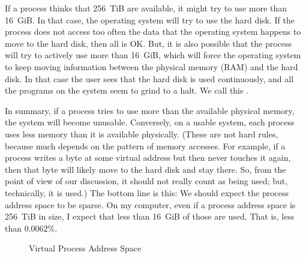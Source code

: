 If a process thinks that 256~TiB are available,
  it might try to use more than 16~GiB\null.
In that case, the operating system will try to use the hard disk.
If the process does not access too often the data that the operating system
  happens to move to the hard disk,
  then all is OK\null.
But, it is also possible that the process will try to actively use
  more than 16~GiB,
  which will force the operating system to keep moving information
    between the physical memory (RAM) and the hard disk.
In that case the user sees that the hard disk is used continuously,
  and all the programs on the system seem to grind to a halt.
We call this .

In summary,
  if a process tries to use more than the available physical memory,
  the system will become unusable.
Conversely,
  on a usable system,
  each process uses less memory than it is available physically.
(These are not hard rules,
  because much depends on the pattern of memory accesses.
For example,
  if a process writes a byte at some virtual address
  but then never touches it again,
  then that byte will likely move to the hard disk and stay there.
So, from the point of view of our discussion,
  it should not really count as being used;
  but, technically, it is used.)
The bottom line is this:
  We should expect the process address space to be sparse.
On my computer,
  even if a process address space is 256~TiB in size,
  I expect that less than 16~GiB of those are used.
That is, less than $0.0062\%$.

\begin{figure}
\begin{center}
\end{center}
\caption{Virtual Process Address Space}
\label{fig:vm}
\end{figure}

